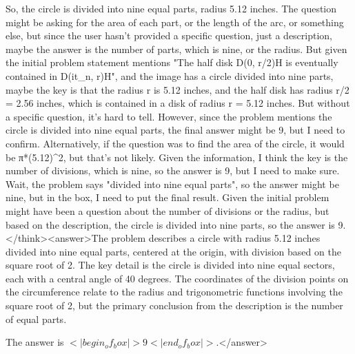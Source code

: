 So, the circle is divided into nine equal parts, radius 5.12 inches. The question might be asking for the area of each part, or the length of the arc, or something else, but since the user hasn't provided a specific question, just a description, maybe the answer is the number of parts, which is nine, or the radius. But given the initial problem statement mentions "The half disk D(0, r/2)H is eventually contained in D(it_n, r)H", and the image has a circle divided into nine parts, maybe the key is that the radius r is 5.12 inches, and the half disk has radius r/2 = 2.56 inches, which is contained in a disk of radius r = 5.12 inches. But without a specific question, it's hard to tell. However, since the problem mentions the circle is divided into nine equal parts, the final answer might be 9, but I need to confirm. Alternatively, if the question was to find the area of the circle, it would be π*(5.12)^2, but that's not likely. Given the information, I think the key is the number of divisions, which is nine, so the answer is 9, but I need to make sure. Wait, the problem says "divided into nine equal parts", so the answer might be nine, but in the box, I need to put the final result. Given the initial problem might have been a question about the number of divisions or the radius, but based on the description, the circle is divided into nine parts, so the answer is 9.</think><answer>The problem describes a circle with radius 5.12 inches divided into nine equal parts, centered at the origin, with division based on the square root of 2. The key detail is the circle is divided into nine equal sectors, each with a central angle of 40 degrees. The coordinates of the division points on the circumference relate to the radius and trigonometric functions involving the square root of 2, but the primary conclusion from the description is the number of equal parts.  

The answer is \(<|begin_of_box|>9<|end_of_box|>\).</answer>